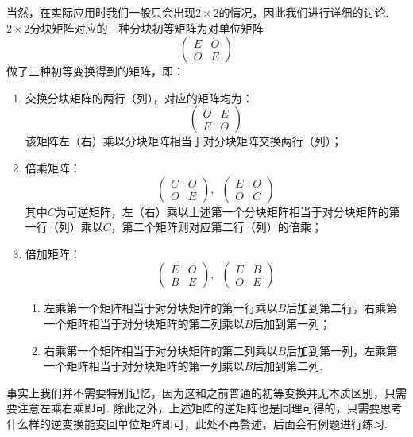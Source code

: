 当然，在实际应用时我们一般只会出现$2\times 2$的情况，因此我们进行详细的讨论. $2\times 2$分块矩阵对应的三种分块初等矩阵为对单位矩阵
\[\begin{pmatrix}
        E & O \\ O & E
    \end{pmatrix}\]做了三种初等变换得到的矩阵，即：
\begin{enumerate}
    \item 交换分块矩阵的两行（列），对应的矩阵均为：
          \[\begin{pmatrix}
                  O & E \\ E & O
              \end{pmatrix}\]
          该矩阵左（右）乘以分块矩阵相当于对分块矩阵交换两行（列）；

    \item 倍乘矩阵：
          \[\begin{pmatrix}
                  C & O \\ O & E
              \end{pmatrix},\enspace\begin{pmatrix}
                  E & O \\ O & C
              \end{pmatrix}\]
          其中$C$为可逆矩阵，左（右）乘以上述第一个分块矩阵相当于对分块矩阵的第一行（列）乘以$C$，第二个矩阵则对应第二行（列）的倍乘；

    \item 倍加矩阵：
          \[\begin{pmatrix}
                  E & O \\ B & E
              \end{pmatrix},\enspace\begin{pmatrix}
                  E & B \\ O & E
              \end{pmatrix}\]
          \begin{enumerate}
              \item 左乘第一个矩阵相当于对分块矩阵的第一行乘以$B$后加到第二行，右乘第一个矩阵相当于对分块矩阵的第二列乘以$B$后加到第一列；

              \item 右乘第一个矩阵相当于对分块矩阵的第二列乘以$B$后加到第一列，左乘第一个矩阵相当于对分块矩阵的第一列乘以$B$后加到第二列.
          \end{enumerate}
\end{enumerate}

事实上我们并不需要特别记忆，因为这和之前普通的初等变换并无本质区别，只需要注意左乘右乘即可. 除此之外，上述矩阵的逆矩阵也是同理可得的，只需要思考什么样的逆变换能变回单位矩阵即可，此处不再赘述，后面会有例题进行练习.

